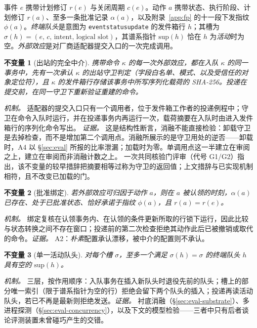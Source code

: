 \documentclass[acmsmall,manuscript,review,anonymous]{acmart}
\renewcommand{\_}{\discretionary{\textunderscore}{}{\textunderscore}}
\newtheorem{invariant}{不变量}
\begin{document}
\begin{definition}[处置状态]
\label{def:state}
事件 $e$ 携带计划修订 $r(e)$ 与关闭周期 $c(e)$。动作 $a$ 携带状态、执行阶段、计划修订 $r(a)$、至多一条批准记录 $\alpha(a)$，以及附录~\ref{app:fp} 的十一段下发指纹 $\phi(a)$。\emph{终端队头}是意图为 \texttt{event\_status\_update} 的发件箱行 $h$；其槽为
$\sigma(h)=(e,\,c,\,\text{intent},\,\text{logical slot})$，其谱系指针
$\mathrm{sup}(h)$ 恰在 $h$ 为\emph{活动}时为空。\emph{外部效应}是对厂商适配器提交入口的一次完成调用。
\end{definition}

\begin{invariant}[出站的完全中介]
\label{inv:mediate}
携带命令 $\kappa$ 的每一次外部效应，都在入队 $\kappa$ 的同一事务中，先有一次承认 $\kappa$ 的出站守卫判定（字段白名单、模式、以及受信任的对象定位符），且 $\kappa$ 的发件箱行存储该事务中所写序列化载荷的 {SHA-256}。投递在提交前，在同一守卫下重新验证重建的命令。
\end{invariant}

\noindent\emph{机制。} 适配器的提交入口只有一个调用者，位于发件箱工作者的投递例程中；守卫在命令入队时运行，并在投递事务内再运行一次，载荷摘要在入队时由进入发件箱行的序列化命令写出。
\emph{证据。} 这是结构性断言，消融不能直接检验：卸载守卫是去掉检查，而不是增加第二个调用点。消融所展示的是守卫用处的逆否——卸载时，A4 以 \S\ref{sec:eval} 所报的比率泄漏；加载时为零。单调用点这一半建立在审阅之上，建立在审阅而非消融计数之上。
一次共同核验门评审（代号 {G1}/{G2}）指出，该不变量的较早措辞把摘要相等过称为守卫的返回值；上文措辞与已实现机制相符，且不改变已加载的门。

\begin{invariant}[批准绑定]
\label{inv:bind}
若外部效应可归因于动作 $a$，则在 $a$ 被认领的时刻，$\alpha(a)$ 已存在、处于已批准状态、恰好承诺于指纹 $\phi(a)$，且 $r(a)=r(e)$。
\end{invariant}

\noindent\emph{机制。} 绑定复核在认领事务内、在认领的条件更新所取的行锁下运行，因此比较与状态转换之间不存在窗口；投递前的第二次检查拒绝其动作此后已被撤销或取代的命令。\emph{证据。} {A2}：\emph{朴素}配置承认漂移，被中介的配置则不承认。

\begin{invariant}[单一活动队头]
\label{inv:head}
对每个槽 $\sigma$，至多一个满足 $\sigma(h)=\sigma$ 的终端队头 $h$ 具有空的 $\mathrm{sup}(h)$。
\end{invariant}

\noindent\emph{机制。} 三层，按作用顺序：入队事务在插入新队头时退役先前的队头；槽上的部分唯一索引（限于谱系指针为空的行）拒绝会留下两个队头的插入；投递再读活动队头，若已不再是最新则拒绝发送。\emph{证据。} 衬底消融（\S\ref{sec:eval-substrate}）、多进程探测（\S\ref{sec:eval-concurrency}），以及下文的模型检验——三者中只有后者谈论评测装置未曾碰巧产生的交错。
\end{document}
